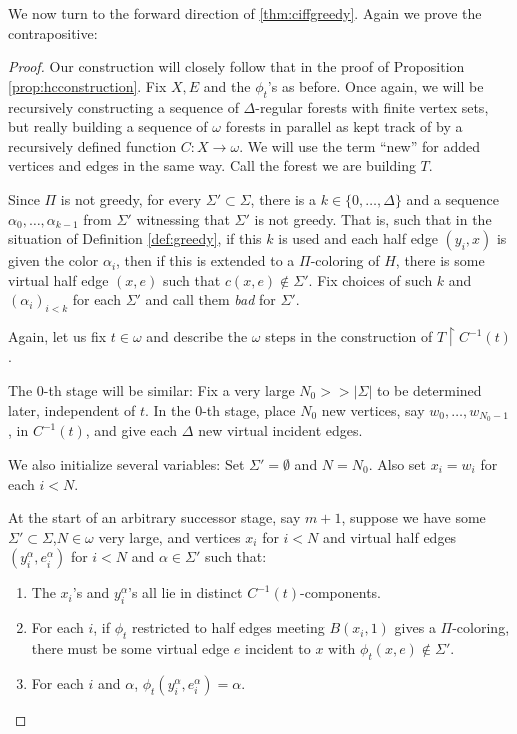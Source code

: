 \documentclass[10pt,a4paper]{amsart}
\theoremstyle{definition}
\newcommand{\res}{\upharpoonright}
\newcommand{\inv}{^{-1}}
\begin{document}
We now turn to the forward direction of \ref{thm:ciffgreedy}. Again we prove the contrapositive:

\begin{proof}
    Our construction will closely follow that in the proof of Proposition \ref{prop:hcconstruction}. Fix $X,E$ and the $\phi_t$'s as before. Once again, we will be recursively constructing a sequence of $\Delta$-regular forests with finite vertex sets, but really building a sequence of $\omega$ forests in parallel as kept track of by a recursively defined function $C:X \rightarrow \omega$. We will use the term ``new'' for added vertices and edges in the same way. Call the forest we are building $T$.
    
    Since $\Pi$ is not greedy, for every $\Sigma' \subset \Sigma$, there is a $k \in \{0,\ldots,\Delta\}$ and a sequence $\alpha_0,\ldots,\alpha_{k-1}$ from $\Sigma'$ witnessing that $\Sigma'$ is not greedy. That is, such that in the situation of Definition \ref{def:greedy}, if this $k$ is used and each half edge $(y_i,x)$ is given the color $\alpha_i$, then if this is extended to a $\Pi$-coloring of $H$, there is some virtual half edge $(x,e)$ such that $c(x,e) \not\in \Sigma'$. Fix choices of such $k$ and $(\alpha_i)_{i < k}$ for each $\Sigma'$ and call them \textit{bad} for $\Sigma'$.
    
    Again, let us fix $t \in \omega$ and describe the $\omega$ steps in the construction of $T \res C\inv(t)$.
    
    The 0-th stage will be similar: Fix a very large $N_0 >> |\Sigma|$ to be determined later, independent of $t$. In the 0-th stage, place $N_0$ new vertices, say $w_0,\ldots,w_{N_0-1}$, in $C\inv(t)$, and give each $\Delta$ new virtual incident edges.
    
    We also initialize several variables: Set $\Sigma' = \emptyset$ and $N = N_0$. Also set $x_i = w_i$ for each $i < N$.
    
    At the start of an arbitrary successor stage, say $m+1$, suppose we have some $\Sigma' \subset \Sigma$,$N \in \omega$ very large, and vertices $x_i$ for $i < N$ and virtual half edges $(y_i^\alpha,e_i^\alpha)$ for $i < N$ and $\alpha \in \Sigma'$ such that:
    \begin{enumerate}
        \item The $x_i$'s and $y_i^\alpha$'s all lie in distinct $C\inv(t)$-components.
        \item For each $i$, if $\phi_t$ restricted to half edges meeting $B(x_i,1)$ gives a $\Pi$-coloring, there must be some virtual edge $e$ incident to $x$ with $\phi_t(x,e) \not\in \Sigma'$.
        \item For each $i$ and $\alpha$, $\phi_t(y_i^\alpha,e_i^\alpha) = \alpha$.
    \end{enumerate}
    

\end{proof}
\end{document}

